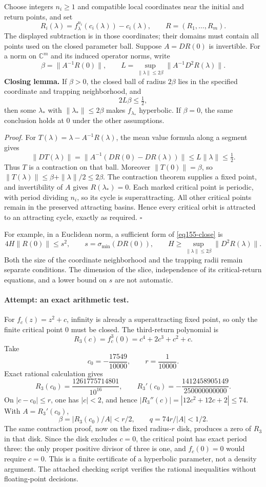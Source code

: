 \documentclass[11pt,a4paper]{article}
\newcommand{\C}{\mathbb{C}}
\numberwithin{equation}{section}
\begin{document}
Choose integers $n_i\ge1$ and compatible local coordinates near the
initial and return points, and set
\[
 R_i(\lambda)=f_\lambda^{n_i}(c_i(\lambda))-c_i(\lambda),
 \qquad R=(R_1,\ldots,R_m).
\]
The displayed subtraction is in those coordinates; their domains must
contain all points used on the closed parameter ball. Suppose
$A=DR(0)$ is invertible. For a norm on $\C^m$ and its induced operator
norms, write
\[
 \beta=\|A^{-1}R(0)\|,\qquad
 L=\sup_{\|\lambda\|\le2\beta}\|A^{-1}D^2R(\lambda)\|.
\]
\textbf{Closing lemma.} If $\beta>0$, the closed ball of radius $2\beta$
lies in the specified coordinate and trapping neighborhood, and
\begin{equation}\label{eq155-close}
 2L\beta\le\tfrac12,
\end{equation}
then some $\lambda_*$ with $\|\lambda_*\|\le2\beta$ makes $f_{\lambda_*}$
hyperbolic. If $\beta=0$, the same conclusion holds at $0$ under the other
assumptions.

\textit{Proof.} For $T(\lambda)=\lambda-A^{-1}R(\lambda)$, the mean value
formula along a segment gives
\[
 \|DT(\lambda)\|
 =\|A^{-1}(DR(0)-DR(\lambda))\|
 \le L\|\lambda\|\le\tfrac12.
\]
Thus $T$ is a contraction on that ball. Moreover
$\|T(0)\|=\beta$, so
$\|T(\lambda)\|\le\beta+\|\lambda\|/2\le2\beta$.
The contraction theorem supplies a fixed point, and invertibility of $A$
gives $R(\lambda_*)=0$. Each marked critical point is periodic, with period
dividing $n_i$, so its cycle is superattracting. All other critical points
remain in the preserved attracting basins. Hence every critical orbit is
attracted to an attracting cycle, exactly as required. \hfill$\square$

For example, in a Euclidean norm, a sufficient form of
\eqref{eq155-close} is
\[
 4H\|R(0)\|\le s^2,
 \qquad s=\sigma_{\min}(DR(0)),\qquad
 H\ge\sup_{\|\lambda\|\le2\beta}\|D^2R(\lambda)\|.
\]
Both the size of the coordinate neighborhood and the trapping radii remain
separate conditions. The dimension of the slice, independence of its
critical-return equations, and a lower bound on $s$ are not automatic.

\paragraph{Attempt: an exact arithmetic test.}
For $f_c(z)=z^2+c$, infinity is already a superattracting fixed point, so
only the finite critical point $0$ must be closed. The third-return
polynomial is
\[
 R_3(c)=f_c^3(0)=c^4+2c^3+c^2+c.
\]
Take
\[
 c_0=-\frac{17549}{10000},\qquad r=\frac1{10000}.
\]
Exact rational calculation gives
\[
 R_3(c_0)=\frac{1261775714801}{10^{16}},\qquad
 R_3'(c_0)=-\frac{1412458905149}{250000000000}.
\]
On $|c-c_0|\le r$, one has $|c|<2$, and hence
$|R_3''(c)|=|12c^2+12c+2|\le74$. With $A=R_3'(c_0)$,
\[
 \beta=|R_3(c_0)/A|<r/2,\qquad q=74r/|A|<1/2.
\]
The same contraction proof, now on the fixed radius-$r$ disk, produces a
zero of $R_3$ in that disk. Since the disk excludes $c=0$, the critical
point has exact period three: the only proper positive divisor of three is
one, and $f_c(0)=0$ would require $c=0$. This is a finite certificate of a
hyperbolic parameter, not a density argument. The attached checking script
verifies the rational inequalities without floating-point decisions.
\end{document}
